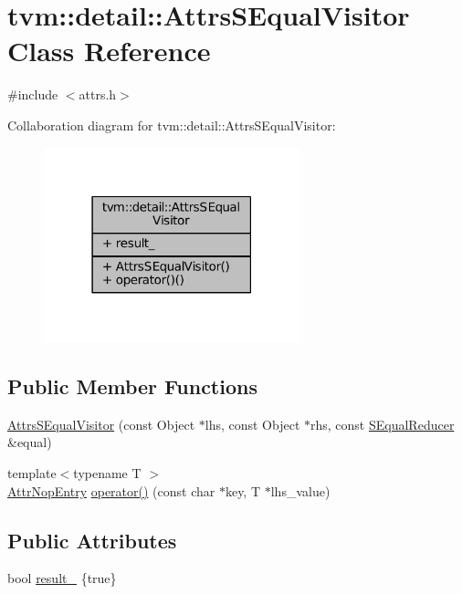 \hypertarget{classtvm_1_1detail_1_1AttrsSEqualVisitor}{}\section{tvm\+:\+:detail\+:\+:Attrs\+S\+Equal\+Visitor Class Reference}
\label{classtvm_1_1detail_1_1AttrsSEqualVisitor}


{\ttfamily \#include $<$attrs.\+h$>$}



Collaboration diagram for tvm\+:\+:detail\+:\+:Attrs\+S\+Equal\+Visitor\+:
\nopagebreak
\begin{figure}[H]
\begin{center}
\leavevmode
\includegraphics[width=210pt]{classtvm_1_1detail_1_1AttrsSEqualVisitor__coll__graph}
\end{center}
\end{figure}
\subsection*{Public Member Functions}
\begin{DoxyCompactItemize}
\item 
\hyperlink{classtvm_1_1detail_1_1AttrsSEqualVisitor_ac67ceda6a413da78e61fa91ca61fcf26}{Attrs\+S\+Equal\+Visitor} (const Object $\ast$lhs, const Object $\ast$rhs, const \hyperlink{classtvm_1_1SEqualReducer}{S\+Equal\+Reducer} \&equal)
\item 
{\footnotesize template$<$typename T $>$ }\\\hyperlink{structtvm_1_1detail_1_1AttrNopEntry}{Attr\+Nop\+Entry} \hyperlink{classtvm_1_1detail_1_1AttrsSEqualVisitor_aaea4233b109948ae631d100368a02ad1}{operator()} (const char $\ast$key, T $\ast$lhs\+\_\+value)
\end{DoxyCompactItemize}
\subsection*{Public Attributes}
\begin{DoxyCompactItemize}
\item 
bool \hyperlink{classtvm_1_1detail_1_1AttrsSEqualVisitor_aeda3a91f0b2d1a7a9a075828954ff77f}{result\+\_\+} \{true\}
\end{DoxyCompactItemize}


